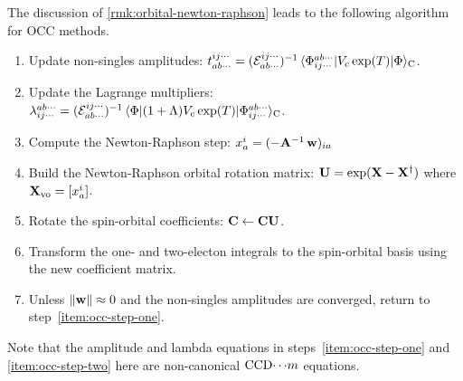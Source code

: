 \documentclass[11pt]{article}
\numberwithin{equation}{section}
\begin{document}
\begin{rmk}
The discussion of \cref{rmk:orbital-newton-raphson} leads to the following algorithm for OCC methods.
\begin{enumerate}
\item
\label{item:occ-step-one}
Update non-singles amplitudes:
$
  t_{ab\cdots}^{ij\cdots}
=
  (\mathcal{E}_{ab\cdots}^{ij\cdots})^{-1}\,
  \langle\Phi _{ij\cdots}^{ab\cdots}|
    V_{\mathrm{c}}\,
    \mathrm{exp}(T)
  |\Phi \rangle_{\mathrm{C}}
$.

\item
\label{item:occ-step-two}
Update the Lagrange multipliers:
$
  \lambda _{ij\cdots}^{ab\cdots}
=
  (\mathcal{E}_{ab\cdots}^{ij\cdots})^{-1}\,
  \langle\Phi |
    (1 + \Lambda )
    V_{\mathrm{c}}\,
    \mathrm{exp}(T)
  |\Phi _{ij\cdots}^{ab\cdots}\rangle_{\mathrm{C}}
$.

\item
Compute the Newton-Raphson step:
$
  x_a^i
=
  (-\mathbf{A}^{-1}\,\mathbf{w})_{ia}
$

\item
Build the Newton-Raphson orbital rotation matrix:
$
  \mathbf{U}
=
  \mathrm{exp}(\mathbf{X} - \mathbf{X}^\dagger)
$
where
$
  \mathbf{X}_{\mathrm{vo}}
=
  [x_a^i]
$.

\item
Rotate the spin-orbital coefficients:
$
  \mathbf{C}
\leftarrow
  \mathbf{C}\mathbf{U}
$.

\item
Transform the one- and two-electon integrals to the spin-orbital basis using the new coefficient matrix.

\item
Unless $\|\mathbf{w}\|\approx0$ and the non-singles amplitudes are converged, return to step~\ref{item:occ-step-one}.
\end{enumerate}
Note that the amplitude and lambda equations in steps~\ref{item:occ-step-one} and \ref{item:occ-step-two} here are non-canonical $\mathrm{CCD}{\cdots}m$ equations.
\end{rmk}
\end{document}
